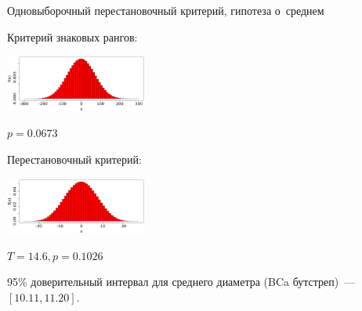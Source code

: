 \documentclass[11pt,pdf,utf8,hyperref={unicode},aspectratio=169]{beamer}
\begin{document}
\begin{frame}[label=perm1s]{\hyperlink{classification}{} Одновыборочный перестановочный критерий, гипотеза о~среднем}
{	Критерий знаковых рангов:
	\begin{center}
		\includegraphics[width=0.35\textwidth]{ranksum24.png}
	\end{center}
	\vspace{-10pt}
	$p=0.0673$

	\bigskip

	Перестановочный критерий:
	\begin{center}
		\includegraphics[width=0.35\textwidth]{perm_wash.png}
	\end{center}
	\vspace{-10pt}
	$T=14.6, p=0.1026$

     95\% доверительный интервал для среднего диаметра (BCa бутстреп)~--- $\left[10.11, 11.20\right]$.
 }
\end{frame}
\end{document}
